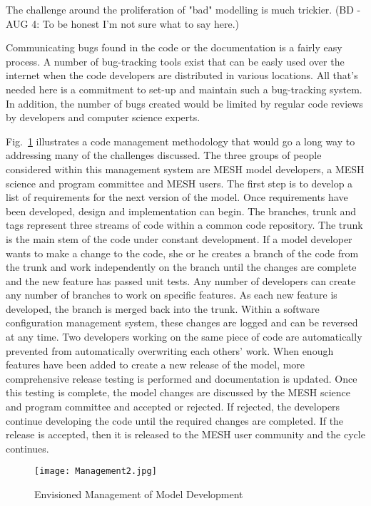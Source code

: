 \documentclass[hess]{copernicus}
\begin{document}
The challenge around the proliferation of "bad" modelling is much trickier. (BD - AUG 4: To be honest I'm not sure what to say here.)

Communicating bugs found in the code or the documentation is a fairly easy process. A number of bug-tracking tools exist that can be easly used over the internet when the code developers are distributed in various locations. All that's needed here is a commitment to set-up and maintain such a bug-tracking system. In addition, the number of bugs created would be limited by regular code reviews by developers and computer science experts.

Fig.~\ref{management} illustrates a code management methodology that would go a long way to addressing many of the challenges discussed. The three groups of people considered within this management system are MESH model developers, a MESH science and program committee and MESH users. The first step is to develop a list of requirements for the next version of the model. Once requirements have been developed, design and implementation can begin. The branches, trunk and tags represent three streams of code within a common code repository. The trunk is the main stem of the code under constant development. If a model developer wants to make a change to the code, she or he creates a branch of the code from the trunk and work independently on the branch until the changes are complete and the new feature has passed unit tests. Any number of developers can create any number of branches to work on specific features. As each new feature is developed, the branch is merged back into the trunk. Within a software configuration management system, these changes are logged and can be reversed at any time. Two developers working on the same piece of code are automatically prevented from automatically overwriting each others' work. When enough features have been added to create a new release of the model, more comprehensive release testing is performed and documentation is updated. Once this testing is complete, the model changes are discussed by the MESH science and program committee and accepted or rejected. If rejected, the developers continue developing the code until the required changes are completed. If the release is accepted, then it is released to the MESH user community and the cycle continues.

\begin{figure}[h!]
\vspace*{2mm}
\begin{center}
\texttt{[image: Management2.jpg]}
\end{center}
\caption{Envisioned Management of Model Development}
\label{management}
\end{figure}
\end{document}
